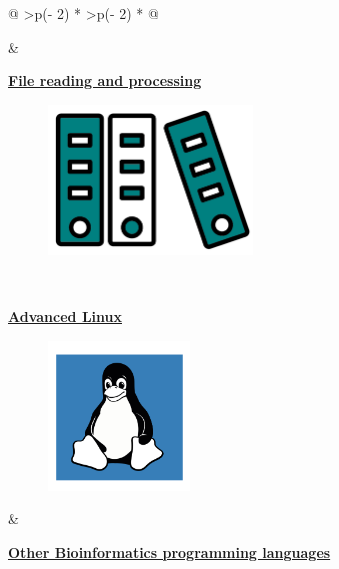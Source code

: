 \documentclass[
  letterpaper,
  DIV=11,
  numbers=noendperiod]{scrreprt}
\begin{document}
\begin{longtable}[]{@{}
  >{\centering\arraybackslash}p{(\columnwidth - 2\tabcolsep) * }
  >{\centering\arraybackslash}p{(\columnwidth - 2\tabcolsep) * }@{}}
\begin{minipage}[t]{\linewidth}
\begin{figure}
{}

\end{figure}
\end{minipage} & \begin{minipage}[t]{\linewidth}\centering
\protect\hyperlink{filereadingandprocessing}{\textbf{File reading and
processing}}

\begin{figure}

{\centering 

\protect\hyperlink{filereadingandprocessing}{\includegraphics[width=2.13542in,height=\textheight]{figures/files.png}}

}

\end{figure}
\end{minipage} \\
\begin{minipage}[t]{\linewidth}\centering
\protect\hyperlink{advancedlinux}{\textbf{Advanced Linux}}

\begin{figure}

{\centering 

\protect\hyperlink{advancedlinux}{\includegraphics[width=1.47917in,height=\textheight]{figures/linux_intermdiary.png}}

}

\end{figure}
\end{minipage} & \begin{minipage}[t]{\linewidth}\centering
\protect\hyperlink{bfxlanguages}{\textbf{Other Bioinformatics
programming languages}}

\begin{figure}


\end{figure}
\end{minipage}
\end{longtable}
\end{document}
